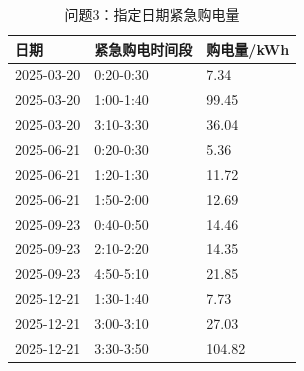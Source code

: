 \begin{table}[H]\centering\scriptsize
\caption{问题3：指定日期紧急购电量}
\begin{tabular}{lll}\toprule 日期&紧急购电时间段&购电量/kWh\\\midrule
2025-03-20&0:20-0:30&7.34\\
2025-03-20&1:00-1:40&99.45\\
2025-03-20&3:10-3:30&36.04\\
2025-06-21&0:20-0:30&5.36\\
2025-06-21&1:20-1:30&11.72\\
2025-06-21&1:50-2:00&12.69\\
2025-09-23&0:40-0:50&14.46\\
2025-09-23&2:10-2:20&14.35\\
2025-09-23&4:50-5:10&21.85\\
2025-12-21&1:30-1:40&7.73\\
2025-12-21&3:00-3:10&27.03\\
2025-12-21&3:30-3:50&104.82\\
\bottomrule\end{tabular}\end{table}
